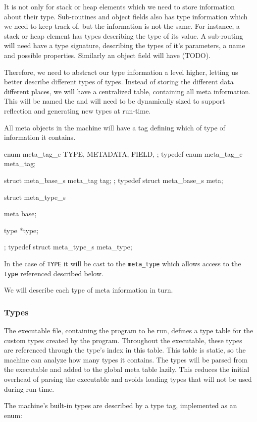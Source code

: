 It is not only for stack or heap elements which we need to store information
about their type. Sub-routines and object fields also has type information which
we need to keep track of, but the information is not the same. For instance, a
stack or heap element has types describing the type of its value. A sub-routing
will need have a type signature, describing the types of it's parameters, a name
and possible properties. Similarly an object field will have (TODO).

Therefore, we need to abstract our type information a level higher, letting us
better describe different types of types. Instead of storing the different data
different places, we will have a centralized table, containing all meta
information. This will be named the  and will need to be
dynamically sized to support reflection and generating new types at run-time.

All meta objects in the machine will have a tag defining which of type of
information it contains.
\begin{ccode}
enum meta_tag_e {
    TYPE,
    METADATA,
    FIELD,
};
typedef enum meta_tag_e meta_tag;

struct meta_base_s {
    meta_tag tag;
};
typedef struct meta_base_s meta;

struct meta_type_s {
    meta base;

    type *type;
};
typedef struct meta_type_s meta_type;
\end{ccode}
In the case of {\tt TYPE} it will be cast to the {\tt meta\_type} which allows
access to the {\tt type} referenced described below.

We will describe each type of meta information in turn.

\subsubsection{Types}
The executable file, containing the program to be run, defines a type table for
the custom types created by the program. Throughout the executable, these types
are referenced through the type's index in this table. This table is static, so
the machine can analyze how many types it contains. The types will be parsed
from the executable and added to the global meta table lazily. This reduces the
initial overhead of parsing the executable and avoids loading types that will
not be used during run-time.

The machine's built-in types are described by a type tag, implemented as an enum:

